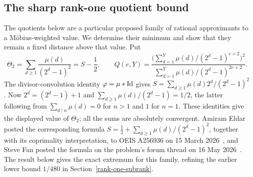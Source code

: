 \documentclass[11pt]{article}
\theoremstyle{plain}
\theoremstyle{definition}
\theoremstyle{remark}
\let\origmathrm\mathrm
\renewcommand{\mathrm}[1]{\ifmmode\origmathrm{#1}\else\textrm{#1}\fi}%
\newcommand{\ph}{\varphi}
\begin{document}
\subsection{The sharp rank-one quotient bound}\label{long249:r3-rankone}
The quotients below are a particular proposed family of rational
approximants to a M\"obius-weighted value. We determine their minimum
and show that they remain a fixed distance above that value. Put
\[
 \Theta_2=\sum_{d\ge1}\frac{\mu(d)}{(2^d-1)^2}=S-\frac12,
 \qquad
 Q(e,Y)=\frac{\bigl(\sum_{d=1}^{Y}\mu(d)/(2^d-1)^{e+2}\bigr)^2}
 {\sum_{d=1}^{Y}\mu(d)/(2^d-1)^{2e+2}}.
\]
The divisor-convolution identity $\ph=\mu*\mathrm{Id}$ gives
$S=\sum_{d\ge1}\mu(d)2^d/(2^d-1)^2$.
Now $2^d=(2^d-1)+1$ and
$\sum_{d\ge1}\mu(d)/(2^d-1)=1/2$, the latter following from
$\sum_{d\mid n}\mu(d)=0$ for $n>1$ and $1$ for $n=1$.
These identities give the displayed value of $\Theta_2$; all the sums are
absolutely convergent. Amiram Eldar posted the corresponding formula
$S=\tfrac12+\sum_{d\ge1}\mu(d)/(2^d-1)^2$, together with its coprimality
interpretation, to OEIS A256936 on 15 March 2026~\cite{eldar2026oeis}, and
Steve Fan posted the formula on the problem's forum thread on
16 May 2026~\cite{fan2026totient}. The result below gives the exact extremum for this family, refining
the earlier lower bound $1/480$ in Section~\ref{rank-one-subrank}.
\end{document}
